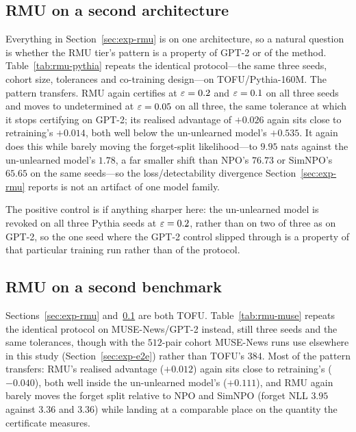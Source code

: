 \subsection{RMU on a second architecture}\label{sec:exp-rmu-pythia}

Everything in Section~\ref{sec:exp-rmu} is on one architecture, so a natural question is
whether the RMU tier's pattern is a property of GPT-2 or of the method. Table~\ref{tab:rmu-pythia}
repeats the identical protocol---the same three seeds, cohort size, tolerances and
co-training design---on TOFU/Pythia-160M. The pattern transfers. RMU again certifies
at $\varepsilon=0.2$ and $\varepsilon=0.1$ on all three seeds and moves to undetermined at
$\varepsilon=0.05$ on all three, the same tolerance at which it stops certifying on GPT-2; its
realised advantage of $+0.026$ again sits close to retraining's $+0.014$, both well
below the un-unlearned model's $+0.535$. It again does this while barely moving the
forget-split likelihood---to $9.95$ nats against the un-unlearned model's $1.78$, a far
smaller shift than NPO's $76.73$ or SimNPO's $65.65$ on the same seeds---so the
loss/detectability divergence Section~\ref{sec:exp-rmu} reports is not an artifact of
one model family.

The positive control is if anything sharper here: the un-unlearned model is revoked on
all three Pythia seeds at $\varepsilon=0.2$, rather than on two of three as on GPT-2, so the
one seed where the GPT-2 control slipped through is a property of that particular
training run rather than of the protocol.

\begin{table}[t]
\centering\small
\caption{The RMU tier of Table~\ref{tab:rmu}, repeated unchanged on TOFU/Pythia-160M
(three seeds, $384$ pairs, cohort target). Same columns as Table~\ref{tab:rmu}.}
\label{tab:rmu-pythia}

\end{table}

\subsection{RMU on a second benchmark}\label{sec:exp-rmu-muse}

Sections~\ref{sec:exp-rmu} and~\ref{sec:exp-rmu-pythia} are both TOFU. Table~\ref{tab:rmu-muse}
repeats the identical protocol on MUSE-News/GPT-2 instead, still three seeds and the
same tolerances, though with the $512$-pair cohort MUSE-News runs use elsewhere in
this study (Section~\ref{sec:exp-e2e}) rather than TOFU's $384$. Most of the pattern
transfers: RMU's realised advantage ($+0.012$) again sits close to retraining's
($-0.040$), both well inside the un-unlearned model's ($+0.111$), and RMU again barely
moves the forget split relative to NPO and SimNPO (forget NLL $3.95$ against $3.36$ and
$3.36$) while landing at a comparable place on the quantity the certificate measures.

